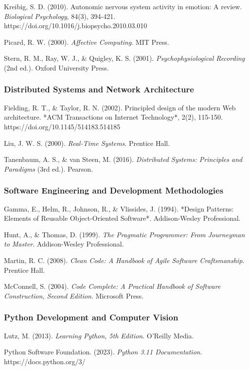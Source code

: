 \documentclass[12pt,a4paper]{article}
\begin{document}
Kreibig, S. D. (2010). Autonomic nervous system activity in emotion: A review. \textit{Biological Psychology}, 84(3),
394-421. https://doi.org/10.1016/j.biopsycho.2010.03.010

Picard, R. W. (2000). \textit{Affective Computing}. MIT Press.

Stern, R. M., Ray, W. J., \& Quigley, K. S. (2001). \textit{Psychophysiological Recording} (2nd ed.). Oxford University Press.

\subsubsection{Distributed Systems and Network Architecture}

Fielding, R. T., \& Taylor, R. N. (2002). Principled design of the modern Web architecture. *ACM Transactions on Internet
Technology*, 2(2), 115-150. https://doi.org/10.1145/514183.514185

Liu, J. W. S. (2000). \textit{Real-Time Systems}. Prentice Hall.

Tanenbaum, A. S., \& van Steen, M. (2016). \textit{Distributed Systems: Principles and Paradigms} (3rd ed.). Pearson.

\subsubsection{Software Engineering and Development Methodologies}

Gamma, E., Helm, R., Johnson, R., \& Vlissides, J. (1994). *Design Patterns: Elements of Reusable Object-Oriented
Software*. Addison-Wesley Professional.

Hunt, A., \& Thomas, D. (1999). \textit{The Pragmatic Programmer: From Journeyman to Master}. Addison-Wesley Professional.

Martin, R. C. (2008). \textit{Clean Code: A Handbook of Agile Software Craftsmanship}. Prentice Hall.

McConnell, S. (2004). \textit{Code Complete: A Practical Handbook of Software Construction, Second Edition}. Microsoft Press.

\subsubsection{Python Development and Computer Vision}

Lutz, M. (2013). \textit{Learning Python, 5th Edition}. O'Reilly Media.

Python Software Foundation. (2023). \textit{Python 3.11 Documentation}. https://docs.python.org/3/
\end{document}
